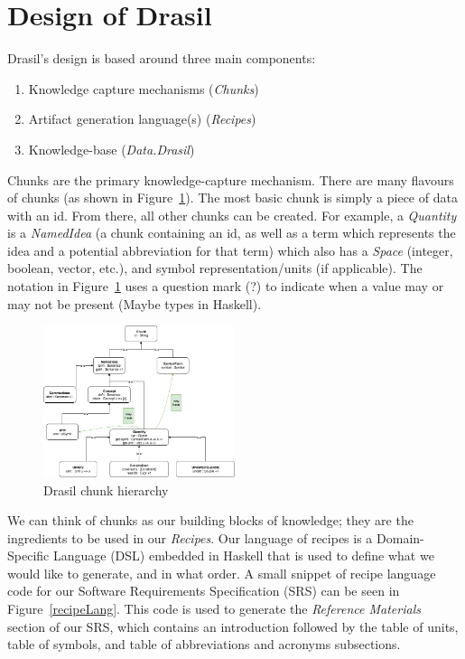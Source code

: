 \documentclass[sigconf]{acmart}
\begin{document}
\section{Design of Drasil} \label{SecDesign}

Drasil's design is based around three main components:
\begin{enumerate}
	\item Knowledge capture mechanisms (\textit{Chunks})
	\item Artifact generation language(s) (\textit{Recipes})
	\item Knowledge-base (\textit{Data.Drasil})
\end{enumerate}

Chunks are the primary knowledge-capture mechanism. There are many flavours of 
chunks (as shown in Figure~\ref{hierarchy}). The most basic chunk is simply a 
piece of data with an id. From there, all other chunks can be created. For 
example, a \textit{Quantity} is a \textit{NamedIdea} (a chunk containing an id, 
as well as a term which represents the idea and a potential abbreviation for 
that term) which also has a \textit{Space} (integer, boolean, vector, etc.), 
and symbol representation/units (if applicable).  The notation in
Figure~\ref{hierarchy} uses a question mark (?) to indicate when a value may or
may not be present (Maybe types in Haskell).

\begin{figure}
	\centering
	\includegraphics[width=0.5\textwidth]{figures/class_hierarchy.png}
	\caption{Drasil chunk hierarchy}
	\label{hierarchy}
\end{figure}

We can think of chunks as our building blocks of knowledge; they are the 
ingredients to be used in our \textit{Recipes}. Our language of recipes is a 
Domain-Specific Language (DSL) embedded in Haskell that is used to define what 
we would like to generate, and in what order. A small snippet of recipe 
language code for our Software Requirements Specification (SRS) can be seen in 
Figure~\ref{recipeLang}. This code is used to generate the \textit{Reference 
Materials} section of our SRS, which contains an introduction followed by the 
table of units, table of symbols, and table of abbreviations and acronyms 
subsections.
\end{document}
